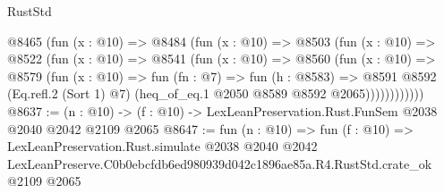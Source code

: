 \begin{lexlean}{RustStd}
\begin{coremodule}
          @8465
            (fun (x : @10) =>
            @8484
              (fun (x : @10) =>
              @8503
                (fun (x : @10) =>
                @8522
                  (fun (x : @10) =>
                  @8541
                    (fun (x : @10) =>
                    @8560
                      (fun (x : @10) =>
                      @8579
                        (fun (x : @10) =>
                        fun (fn : @7) =>
                        fun (h : @8583) =>
                        @8591
                          @8592
                          (Eq.refl.{2} (Sort 1) @7)
                          (heq_of_eq.{1} @2050 @8589 @8592 @2065))))))))))))
@8637 := (n : @10) -> (f : @10) -> LexLeanPreservation.Rust.FunSem @2038 @2040 @2042 @2109 @2065
@8647 := fun (n : @10) =>
  fun (f : @10) =>
  LexLeanPreservation.Rust.simulate
    @2038
    @2040
    @2042
    LexLeanPreserve.C0b0ebcfdb6ed980939d042c1896ae85a.R4.RustStd.crate_ok
    @2109
    @2065
\end{coremodule}
\end{lexlean}
